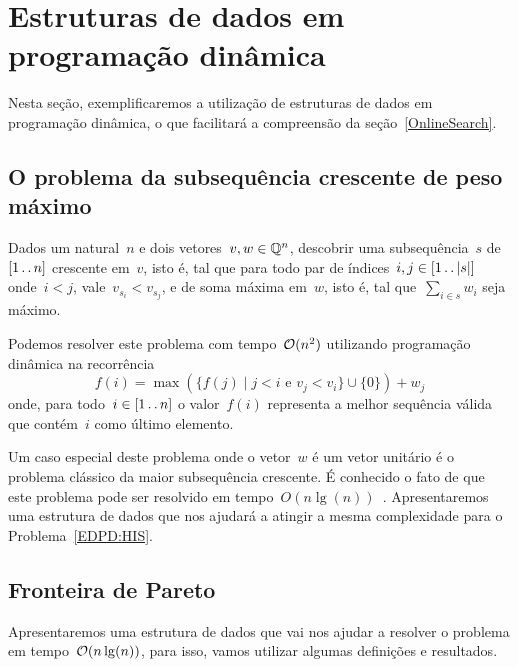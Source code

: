 \section{Estruturas de dados em programação dinâmica}
\label{EDPD}

Nesta seção, exemplificaremos a utilização de estruturas de dados em programação dinâmica, o que facilitará a compreensão da seção~\ref{OnlineSearch}.


\subsection{O problema da subsequência crescente de peso máximo}

\begin{prob} \label{EDPD:HIS}
Dados um natural~$n$ e dois vetores~$v,w \in \mathbb{Q}^n$, descobrir uma subsequência~$s$ de~$[1 \,.\,.\, n]$ crescente em~$v$, isto é, tal que para todo par de índices~$i,j \in [1 \,.\,.\, |s|]$ onde~$i < j$, vale~$v_{s_i} < v_{s_j}$, e de soma máxima em~$w$, isto é, tal que~$\sum\limits_{i \in s} w_i$ seja máximo.
\end{prob}

Podemos resolver este problema com tempo~$\mathcal{O}(n^2)$ utilizando programação dinâmica na recorrência
\begin{equation} \label{EDPD:HIS:rec}
f(i) = \max(\{f(j) \mid j < i \text{ e } v_j < v_i\} \cup \{0\}) + w_j
\end{equation}
onde, para todo~$i \in [1 \,.\,.\, n]$ o valor~$f(i)$ representa a melhor sequência válida que contém~$i$ como último elemento.

Um caso especial deste problema onde o vetor~$w$ é um vetor unitário é o problema clássico da maior subsequência crescente. É conhecido o fato de que este problema pode ser resolvido em tempo~$O(n\lg(n))$~\cite{missing}. Apresentaremos uma estrutura de dados que nos ajudará a atingir a mesma complexidade para o Problema~\ref{EDPD:HIS}.


\subsection{Fronteira de Pareto}

Apresentaremos uma estrutura de dados que vai nos ajudar a resolver o problema em tempo~$\mathcal{O}(n\lg(n))$, para isso, vamos utilizar algumas definições e resultados.

